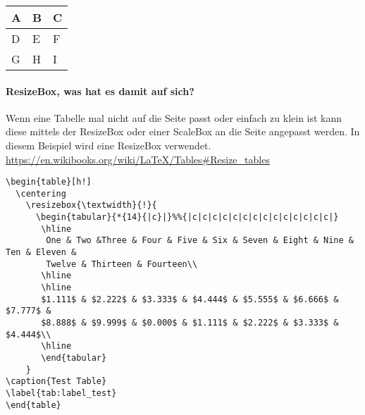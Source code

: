 \begin{tabular}{ | l | l | l | }
	\hline
	A & B & C \\
	\hline
	D & E & \cellcolor{green}F \\
	\hline
	G & H & I \\
	\hline
\end{tabular}
\paragraph{ResizeBox, was hat es damit auf sich?}
Wenn eine Tabelle mal nicht auf die Seite passt oder einfach zu klein ist kann diese mittels der ResizeBox oder einer ScaleBox an die Seite angepasst werden. In diesem Beispiel wird eine ResizeBox verwendet. \url{https://en.wikibooks.org/wiki/LaTeX/Tables#Resize_tables}

\begin{lstlisting}[style=LaTeX]
\begin{table}[h!]
  \centering
    \resizebox{\textwidth}{!}{
      \begin{tabular}{*{14}{|c}|}%%{|c|c|c|c|c|c|c|c|c|c|c|c|c|c|}
       \hline
        One & Two &Three & Four & Five & Six & Seven & Eight & Nine & Ten & Eleven &
        Twelve & Thirteen & Fourteen\\
       \hline
       \hline
       $1.111$ & $2.222$ & $3.333$ & $4.444$ & $5.555$ & $6.666$ & $7.777$ &
       $8.888$ & $9.999$ & $0.000$ & $1.111$ & $2.222$ & $3.333$ & $4.444$\\
       \hline
       \end{tabular}
    }
\caption{Test Table}
\label{tab:label_test}
\end{table}
\end{lstlisting}

	\begin{table}[h!]
		\centering
		\caption{Test Table}
		\label{tab:label_test}
	\end{table}
